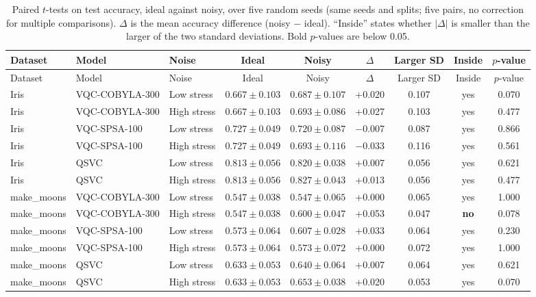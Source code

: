 \documentclass[12pt,a4paper]{article}
\newcommand{\chgcolor}{blue}
\begin{document}
{\scriptsize
\setlength{\tabcolsep}{2pt}
\renewcommand{\arraystretch}{1.1}
{\color{\chgcolor}
\begin{longtable}{lllcccccc}
\caption{Paired $t$-tests on test accuracy, ideal against noisy, over five random seeds (same seeds and splits; five pairs, no correction for multiple comparisons). $\Delta$ is the mean accuracy difference (noisy $-$ ideal). ``Inside'' states whether $|\Delta|$ is smaller than the larger of the two standard deviations. Bold $p$-values are below 0.05.}
\label{tab:noise_ttests}\\
\toprule
Dataset & Model & Noise & Ideal & Noisy & $\Delta$ & Larger SD & Inside & $p$-value \\
\midrule
\endfirsthead
\toprule
Dataset & Model & Noise & Ideal & Noisy & $\Delta$ & Larger SD & Inside & $p$-value \\
\midrule
\endhead
\bottomrule
\endfoot
Iris & VQC-COBYLA-300 & Low stress & $0.667\pm0.103$ & $0.687\pm0.107$ & +0.020 & 0.107 & yes & 0.070 \\
Iris & VQC-COBYLA-300 & High stress & $0.667\pm0.103$ & $0.693\pm0.086$ & +0.027 & 0.103 & yes & 0.477 \\
Iris & VQC-SPSA-100 & Low stress & $0.727\pm0.049$ & $0.720\pm0.087$ & $-$0.007 & 0.087 & yes & 0.866 \\
Iris & VQC-SPSA-100 & High stress & $0.727\pm0.049$ & $0.693\pm0.116$ & $-$0.033 & 0.116 & yes & 0.561 \\
Iris & QSVC & Low stress & $0.813\pm0.056$ & $0.820\pm0.038$ & +0.007 & 0.056 & yes & 0.621 \\
Iris & QSVC & High stress & $0.813\pm0.056$ & $0.827\pm0.043$ & +0.013 & 0.056 & yes & 0.477 \\
\midrule
make\_moons & VQC-COBYLA-300 & Low stress & $0.547\pm0.038$ & $0.547\pm0.065$ & +0.000 & 0.065 & yes & 1.000 \\
make\_moons & VQC-COBYLA-300 & High stress & $0.547\pm0.038$ & $0.600\pm0.047$ & +0.053 & 0.047 & \textbf{no} & 0.078 \\
make\_moons & VQC-SPSA-100 & Low stress & $0.573\pm0.064$ & $0.607\pm0.028$ & +0.033 & 0.064 & yes & 0.230 \\
make\_moons & VQC-SPSA-100 & High stress & $0.573\pm0.064$ & $0.573\pm0.072$ & +0.000 & 0.072 & yes & 1.000 \\
make\_moons & QSVC & Low stress & $0.633\pm0.053$ & $0.640\pm0.064$ & +0.007 & 0.064 & yes & 0.621 \\
make\_moons & QSVC & High stress & $0.633\pm0.053$ & $0.653\pm0.038$ & +0.020 & 0.053 & yes & 0.070 \\

\end{longtable}}}
\end{document}

